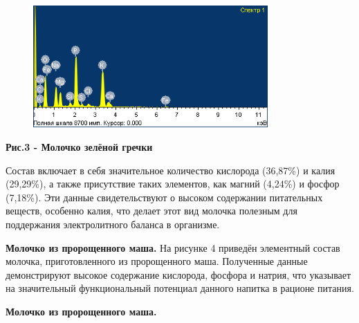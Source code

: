 \begin{figure}[H]
	\centering
	\includegraphics[width=0.8\textwidth]{media/pish/image50}
	\caption*{}
\end{figure}


{\bfseries Рис.3 - Молочко зелёной гречки}

Состав включает в себя значительное количество кислорода (36,87\%) и
калия (29,29\%), а также присутствие таких элементов, как магний
(4,24\%) и фосфор (7,18\%). Эти данные свидетельствуют о высоком
содержании питательных веществ, особенно калия, что делает этот вид
молочка полезным для поддержания электролитного баланса в организме.

{\bfseries Молочко из пророщенного маша.} На рисунке 4 приведён элементный
состав молочка, приготовленного из пророщенного маша. Полученные данные
демонстрируют высокое содержание кислорода, фосфора и натрия, что
указывает на значительный функциональный потенциал данного напитка в
рационе питания.

{\bfseries Молочко из пророщенного маша.}

